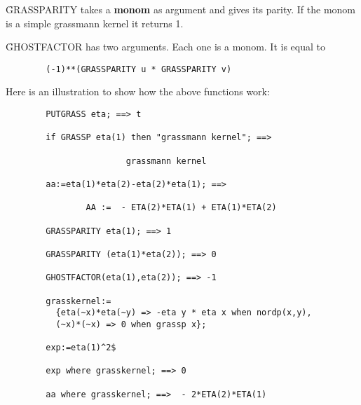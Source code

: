 \f{GRASSPARITY} takes a {\bf monom}  as argument and gives its parity.
If the monom is a simple grassmann kernel it returns 1.

\f{GHOSTFACTOR} has two arguments. Each one is a monom. It is equal to
\begin{verbatim}
        (-1)**(GRASSPARITY u * GRASSPARITY v)
\end{verbatim}
Here is an illustration to show how the above functions work:
\begin{verbatim}
        PUTGRASS eta; ==> t

        if GRASSP eta(1) then "grassmann kernel"; ==>

                        grassmann kernel

        aa:=eta(1)*eta(2)-eta(2)*eta(1); ==>

                AA :=  - ETA(2)*ETA(1) + ETA(1)*ETA(2)

        GRASSPARITY eta(1); ==> 1

        GRASSPARITY (eta(1)*eta(2)); ==> 0

        GHOSTFACTOR(eta(1),eta(2)); ==> -1

        grasskernel:=
          {eta(~x)*eta(~y) => -eta y * eta x when nordp(x,y),
          (~x)*(~x) => 0 when grassp x};

        exp:=eta(1)^2$

        exp where grasskernel; ==> 0

        aa where grasskernel; ==>  - 2*ETA(2)*ETA(1)
\end{verbatim}

